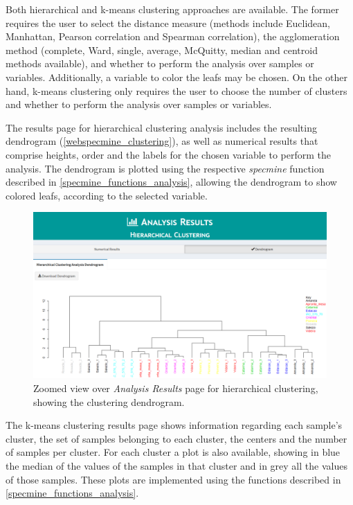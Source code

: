Both hierarchical and k-means clustering approaches are available. The former requires the user to select the distance measure (methods include Euclidean, Manhattan, Pearson correlation and Spearman correlation), the agglomeration method (complete, Ward, single, average, McQuitty, median and centroid methods available), and whether to perform the analysis over samples or variables. Additionally, a variable to color the leafs may be chosen. On the other hand, k-means clustering only requires the user to choose the number of clusters and whether to perform the analysis over samples or variables.

The results page for hierarchical clustering analysis includes the resulting dendrogram (\autoref{webspecmine_clustering}), as well as numerical results that comprise heights, order and the labels for the chosen variable to perform the analysis. The dendrogram is plotted using the respective \textit{specmine} function described in \autoref{specmine_functions_analysis}, allowing the dendrogram to show colored leafs, according to the selected variable.

\begin{figure}[h]
	\centering
	\includegraphics[width=0.9\linewidth]{Imagens/webspecmine_clustering}
	\caption{Zoomed view over \textit{Analysis Results} page for hierarchical clustering, showing the clustering dendrogram.}
	\label{webspecmine_clustering}
\end{figure}

The k-means clustering results page shows information regarding each sample's cluster, the set of samples belonging to each cluster, the centers and the number of samples per cluster. For each cluster a plot is also available, showing in blue the median of the values of the samples in that cluster and in grey all the values of those samples. These plots are implemented using the functions described in \autoref{specmine_functions_analysis}.



